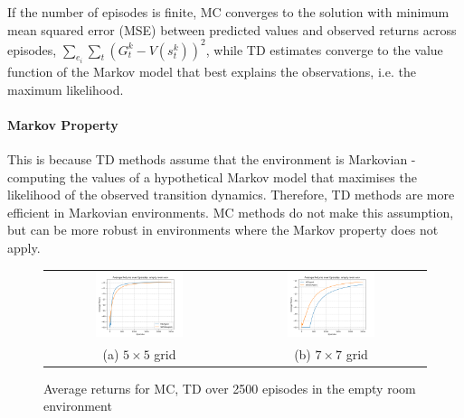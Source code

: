 \documentclass[12pt]{article}
\begin{document}
If the number of episodes is finite,
MC converges to the solution with minimum mean squared error (MSE)
between predicted values and observed returns across episodes,
$\sum_{e_i}{\sum_t{(G_t^k - V(s_t^k))^2}}$,
while TD estimates converge to the value function of the Markov model that best explains the observations, i.e. the maximum likelihood.

\paragraph{Markov Property}

This is because TD methods assume that the environment is Markovian - computing
the values of a hypothetical Markov model that maximises the likelihood of the observed transition dynamics.
Therefore, TD methods are more efficient in Markovian environments.
MC methods do not make this assumption, but can be more robust in environments where the Markov property does not apply.

\begin{figure}[!h]
	\centering
	\begin{tabular}{cc}
		\includegraphics[width=0.48\textwidth]{figures/mc-td-empty-room-5x5.png} &
		\includegraphics[width=0.48\textwidth]{figures/mc-td-empty-room-7x7.png}                         \\
		(a) $5 \times 5$ grid                                                    & (b) $7 \times 7$ grid
	\end{tabular}
	\caption{Average returns for MC, TD over 2500 episodes in the empty room environment}
	\label{fig:mc-td-empty-room-comparison}
\end{figure}
\end{document}
